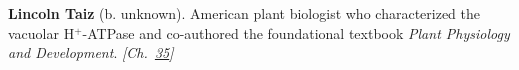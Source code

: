 \textbf{Lincoln Taiz} (b. unknown). American plant biologist who characterized the vacuolar H$^+$-ATPase and co-authored the foundational textbook \emph{Plant Physiology and Development}. \emph{[Ch.~\hyperref[ch:treesfromair]{35}]}

